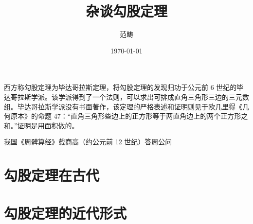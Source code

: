 \documentclass[UTF8]{ctexart}
\title{杂谈勾股定理}
\author{范畴}
\date{\today}
\begin{document}
西方称勾股定理为毕达哥拉斯定理，将勾股定理的发现归功于公元前 6 世纪的毕达哥拉斯学派。该学派得到了一个法则，可以求出可排成直角三角形三边的三元数组。毕达哥拉斯学派没有书面著作，该定理的严格表述和证明则见于欧几里得《几何原本》的命题 47：“直角三角形些边上的正方形等于两直角边上的两个正方形之和。”证明是用面积做的。

我国《周髀算经》载商高（约公元前 12 世纪）答周公问
\maketitle
\tableofcontents
\section{勾股定理在古代}
\section{勾股定理的近代形式}

\end{document}
